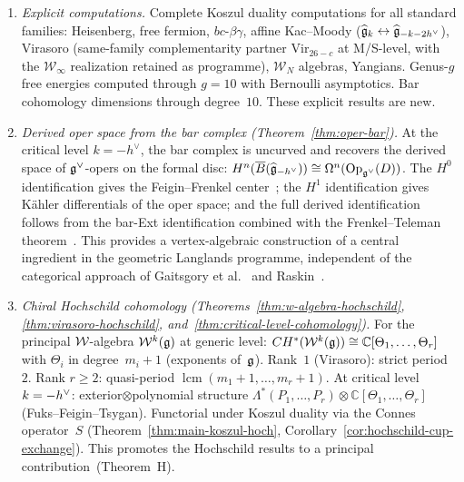 \begin{enumerate}[label=\emph{(\arabic*)}]
\item \emph{Explicit computations.}
  Complete Koszul duality computations for all standard families:
  Heisenberg, free fermion, $bc$-$\beta\gamma$, affine Kac--Moody
  ($\widehat{\mathfrak{g}}_k \leftrightarrow \widehat{\mathfrak{g}}_{-k-2h^\vee}$),
  Virasoro
  \textup{(}same-family complementarity partner
  $\mathrm{Vir}_{26-c}$ at M/S-level, with the
  $\mathcal{W}_\infty$ realization retained as programme\textup{)},
  $\mathcal{W}_N$ algebras, Yangians.
  Genus-$g$ free energies computed through $g = 10$ with
  Bernoulli asymptotics.  Bar cohomology dimensions through
  degree~$10$.  These explicit results are new.

\item \emph{Derived oper space from the bar complex
  (Theorem~\ref{thm:oper-bar}).}
  At the critical level $k = -h^\vee$, the bar complex is uncurved
  and recovers the derived space of
  $\mathfrak{g}^\vee$-opers on the formal disc:
  $H^n(\overline{B}(\widehat{\mathfrak{g}}_{-h^\vee}))
  \cong \Omega^n(\mathrm{Op}_{\mathfrak{g}^\vee}(D))$.
  The $H^0$ identification gives the Feigin--Frenkel
  center~\cite{Feigin-Frenkel}; the $H^1$ identification
  gives K\"ahler differentials of the oper space; and the
  full derived identification follows from the bar-Ext
  identification combined with the
  Frenkel--Teleman theorem~\cite{FT06}.
  This provides a vertex-algebraic construction of a
  central ingredient in the geometric Langlands programme,
  independent of the categorical approach of
  Gaitsgory et al.~\cite{GLC24} and
  Raskin~\cite{Raskin24}.

\item \emph{Chiral Hochschild cohomology
  (Theorems~\ref{thm:w-algebra-hochschild},
  \ref{thm:virasoro-hochschild},
  and~\ref{thm:critical-level-cohomology}).}
  For the principal $\mathcal{W}$-algebra $\mathcal{W}^k(\mathfrak{g})$ at generic level:
  $CH^*(\mathcal{W}^k(\mathfrak{g})) \cong \mathbb{C}[\Theta_1, \ldots, \Theta_r]$
  with $\Theta_i$ in degree~$m_i + 1$ (exponents of~$\mathfrak{g}$).
  Rank~$1$ (Virasoro): strict period~$2$.
  Rank $r \geq 2$: quasi-period $\operatorname{lcm}(m_1+1, \ldots, m_r+1)$.
  At critical level $k = -h^\vee$:
  exterior$\otimes$polynomial structure
  $\Lambda^*(P_1, \ldots, P_r) \otimes \mathbb{C}[\Theta_1, \ldots, \Theta_r]$
  (Fuks--Feigin--Tsygan).
  Functorial under Koszul duality via the Connes
  operator~$S$ (Theorem~\ref{thm:main-koszul-hoch},
  Corollary~\ref{cor:hochschild-cup-exchange}).
  This promotes the Hochschild results to a
  principal contribution~(Theorem~H).

\end{enumerate}

